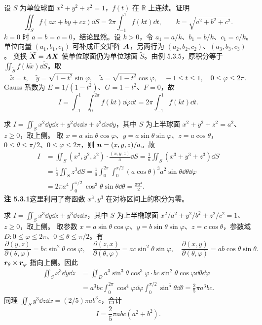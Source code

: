 设 $S$ 为单位球面 $x^2+y^2+z^2=1$，$f(t)$ 在 $\mathbb R$ 上连续。证明
\[
\iint_Sf(ax+by+cz)\dd S=2\pi\int_{-1}^1f(kt)\dd t,\qquad k=\sqrt{a^2+b^2+c^2}.
\]
\prooftext $k=0$ 时 $a=b=c=0$，结论显然。设 $k>0$，令 $a_1=a/k$、$b_1=b/k$、$c_1=c/k$。单位向量 $(a_1,b_1,c_1)$ 可补成正交矩阵 $\bm{A}$，另两行为 $(a_2,b_2,c_2)$、$(a_3,b_3,c_3)$。
变换 $\widetilde{\bm{X}}=\bm{A}\bm{X}$ 使单位球面仍为单位球面 $\widetilde S$。由例 5.3.5，原积分等于 $\iint_{\widetilde S}f(k\widetilde x)\dd\widetilde S$。取
\[
\widetilde x=t,\quad\widetilde y=\sqrt{1-t^2}\sin\varphi,\quad
\widetilde z=\sqrt{1-t^2}\cos\varphi,\quad -1\le t\le1,\quad0\le\varphi\le2\pi.
\]
Gauss 系数为 $E=1/(1-t^2)$、$G=1-t^2$、$F=0$，故
\[
I=\int_{-1}^1\int_0^{2\pi}f(kt)\dd\varphi\dd t=2\pi\int_{-1}^1f(kt)\dd t.
\]

求 $I=\iint_Sx^2\dd y\dd z+y^2\dd z\dd x+z^2\dd x\dd y$，其中 $S$ 为上半球面 $x^2+y^2+z^2=a^2$、$z\ge0$，取上侧。
\sol 取 $x=a\sin\theta\cos\varphi$、$y=a\sin\theta\sin\varphi$、$z=a\cos\theta$，$0\le\theta\le\pi/2$、$0\le\varphi\le2\pi$，则 $\bm{n}=(x,y,z)/a$。故
\begin{align*}
I&=\iint_S(x^2,y^2,z^2)\cdot\frac{(x,y,z)}a\dd S
=\frac1a\iint_S(x^3+y^3+z^3)\dd S\\
&=\frac1a\iint_Sz^3\dd S
=\frac1a\int_0^{2\pi}\int_0^{\pi/2}(a\cos\theta)^3a^2\sin\theta\dd\theta\dd\varphi\\
&=2\pi a^4\int_0^{\pi/2}\cos^3\theta\sin\theta\dd\theta=\frac{\pi a^4}2.
\end{align*}
\textbf{注 5.3.1}\quad 这里利用了奇函数 $x^3,y^3$ 在对称区间上的积分为零。

求 $I=\iint_Sx^3\dd y\dd z+y^3\dd z\dd x$，其中 $S$ 为上半椭球面 $x^2/a^2+y^2/b^2+z^2/c^2=1$、$z\ge0$，取上侧。
\sol 取参数 $x=a\sin\theta\cos\varphi$、$y=b\sin\theta\sin\varphi$、$z=c\cos\theta$，参数域 $D:0\le\varphi\le2\pi$、$0\le\theta\le\pi/2$。有
\[
\frac{\partial(y,z)}{\partial(\theta,\varphi)}=bc\sin^2\theta\cos\varphi,\quad
\frac{\partial(z,x)}{\partial(\theta,\varphi)}=ac\sin^2\theta\sin\varphi,\quad
\frac{\partial(x,y)}{\partial(\theta,\varphi)}=ab\cos\theta\sin\theta.
\]
$\bm{r}_\theta\times\bm{r}_\varphi$ 指向上侧。因此
\begin{align*}
\iint_Sx^3\dd y\dd z
&=\iint_Da^3\sin^3\theta\cos^3\varphi\cdot bc\sin^2\theta\cos\varphi\dd\theta\dd\varphi\\
&=a^3bc\int_0^{2\pi}\cos^4\varphi\dd\varphi\int_0^{\pi/2}\sin^5\theta\dd\theta
=\frac25\pi a^3bc.
\end{align*}
同理 $\iint_Sy^3\dd z\dd x=(2/5)\pi ab^3c$，合计
\[
I=\frac25\pi abc(a^2+b^2).
\]

